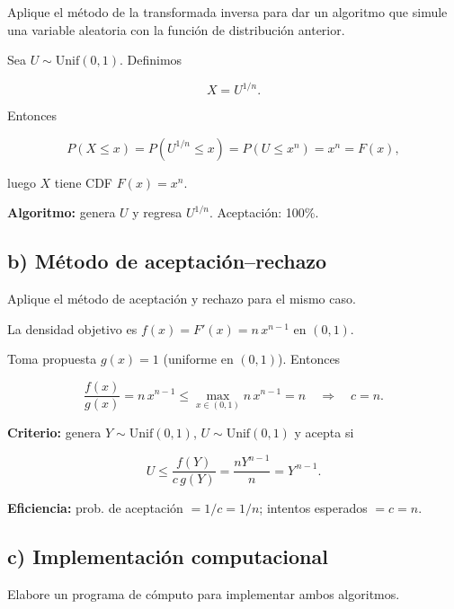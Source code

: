 \documentclass[10pt,a4paper]{article}
\let\le\leqslant
\let\leq\leqslant
\let\le\leq
\begin{document}
    Aplique el método de la transformada inversa para dar un algoritmo que
simule una variable aleatoria con la función de distribución anterior.

    Sea \(U\sim\mathrm{Unif}(0,1)\). Definimos

\[
X = U^{1/n}.
\]

Entonces

\[
P(X\le x)=P(U^{1/n}\le x)=P(U\le x^n)=x^n=F(x),
\]

luego \(X\) tiene CDF \(F(x)=x^n\).

\textbf{Algoritmo:} genera \(U\) y regresa \(U^{1/n}\). Aceptación:
100\%.

    \hypertarget{b-muxe9todo-de-aceptaciuxf3nrechazo}{%
\subsection{b) Método de
aceptación--rechazo}\label{b-muxe9todo-de-aceptaciuxf3nrechazo}}

    Aplique el método de aceptación y rechazo para el mismo caso.

    La densidad objetivo es \(f(x)=F'(x)=n\,x^{n-1}\) en \((0,1)\).

Toma propuesta \(g(x)=1\) (uniforme en \((0,1)\)). Entonces

\[
\frac{f(x)}{g(x)}=n\,x^{n-1}\le \max_{x\in(0,1)} n\,x^{n-1}=n \quad\Rightarrow\quad \boxed{c=n}.
\]

\textbf{Criterio:} genera \(Y\sim\mathrm{Unif}(0,1)\),
\(U\sim\mathrm{Unif}(0,1)\) y acepta si

\[
U \le \frac{f(Y)}{c\,g(Y)}=\frac{nY^{n-1}}{n}=Y^{\,n-1}.
\]

\textbf{Eficiencia:} prob. de aceptación \(=1/c=1/n\); intentos
esperados \(=c=n\).

    \hypertarget{c-implementaciuxf3n-computacional}{%
\subsection{c) Implementación
computacional}\label{c-implementaciuxf3n-computacional}}

    Elabore un programa de cómputo para implementar ambos algoritmos.
\end{document}
